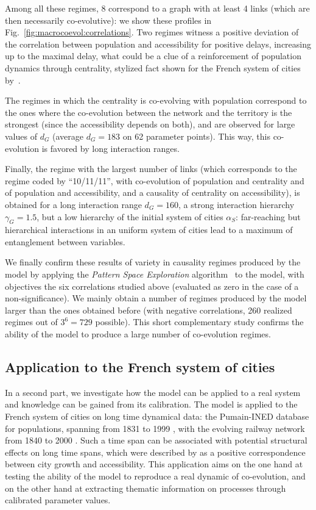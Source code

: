 \documentclass[11pt]{article}
\begin{document}
Among all these regimes, 8 correspond to a graph with at least 4 links (which are then necessarily co-evolutive): we show these profiles in Fig.~\ref{fig:macrocoevol:correlations}. Two regimes witness a positive deviation of the correlation between population and accessibility for positive delays, increasing up to the maximal delay, what could be a clue of a reinforcement of population dynamics through centrality, stylized fact shown for the French system of cities by~\cite{bretagnolle:tel-00459720}.


The regimes in which the centrality is co-evolving with population correspond to the ones where the co-evolution between the network and the territory is the strongest (since the accessibility depends on both), and are observed for large values of $d_G$ (average $d_G=183$ on 62 parameter points). This way, this co-evolution is favored by long interaction ranges. 


Finally, the regime with the largest number of links (which corresponds to the regime coded by ``10/11/11'', with co-evolution of population and centrality and of population and accessibility, and a causality of centrality on accessibility), is obtained for a long interaction range $d_G = 160$, a strong interaction hierarchy $\gamma_G = 1.5$, but a low hierarchy of the initial system of cities $\alpha_S$: far-reaching but hierarchical interactions in an uniform system of cities lead to a maximum of entanglement between variables.  





We finally confirm these results of variety in causality regimes produced by the model by applying the \emph{Pattern Space Exploration} algorithm~\citep{10.1371/journal.pone.0138212} to the model, with objectives the six correlations studied above (evaluated as zero in the case of a non-significance). We mainly obtain a number of regimes produced by the model larger than the ones obtained before (with negative correlations, 260 realized regimes out of $3^6 = 729$ possible). This short complementary study confirms the ability of the model to produce a large number of co-evolution regimes. 


\subsection{Application to the French system of cities}


In a second part, we investigate how the model can be applied to a real system and knowledge can be gained from its calibration. The model is applied to the French system of cities on long time dynamical data: the Pumain-INED database for populations, spanning from 1831 to 1999 \citep{pumain1986fichier}, with the evolving railway network from 1840 to 2000 \citep{thevenin2013mapping}. Such a time span can be associated with potential structural effects on long time spans, which were described by \cite{bretagnolle2003vitesse} as a positive correspondence between city growth and accessibility. This application aims on the one hand at testing the ability of the model to reproduce a real dynamic of co-evolution, and on the other hand at extracting thematic information on processes through calibrated parameter values.
\end{document}
